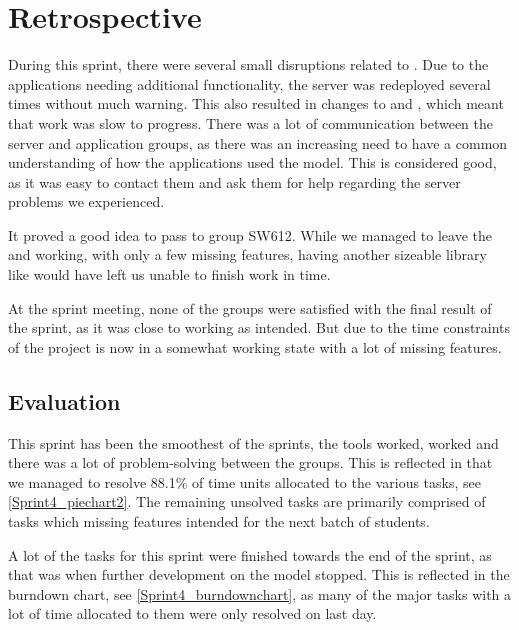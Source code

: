 \section{Retrospective}
During this sprint, there were several small disruptions related to .
Due to the applications needing additional functionality, the server was
redeployed several times without much warning. This also resulted in changes to
 and , which meant that work was
slow to progress. There was a lot of communication between the
server and application groups, as there was an increasing need to have a common
understanding of how the applications used the model. This is considered good,
as it was easy to contact them and ask them for help regarding the server
problems we experienced.\nl

It proved a good idea to pass  to group SW612. While we
managed to leave the  and  working, with
only a few missing features, having another sizeable library like
 would have left us unable to finish work in time.\nl

At the sprint meeting, none of the groups were satisfied with the final result of
the sprint, as it was close to working as intended. But due to the time
constraints of the project is now in a somewhat working state with a lot of
missing features.\nl

\subsection{Evaluation}

This sprint has been the smoothest of the sprints, the tools worked,
 worked and there was a lot of problem-solving between the groups.
This is reflected in that we managed to resolve 88.1\% of time units allocated
to the various tasks, see \autoref{Sprint4_piechart2}. The remaining unsolved
tasks are primarily comprised of tasks which missing features intended for the
next batch of students.


A lot of the tasks for this sprint were finished towards the end of the sprint,
as that was when further development on the  model stopped. This is
reflected in the burndown chart, see \autoref{Sprint4_burndownchart}, as many of
the major tasks with a lot of time allocated to them were only resolved on last
day.



